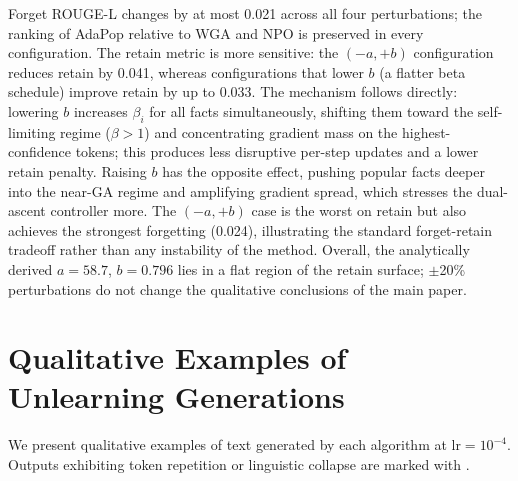Forget ROUGE-L changes by at most 0.021 across all four perturbations; the ranking of AdaPop relative to WGA and NPO is preserved in every configuration. The retain metric is more sensitive: the $(-a,+b)$ configuration reduces retain by 0.041, whereas configurations that lower $b$ (a flatter beta schedule) improve retain by up to 0.033. The mechanism follows directly: lowering $b$ increases $\beta_i$ for all facts simultaneously, shifting them toward the self-limiting regime ($\beta > 1$) and concentrating gradient mass on the highest-confidence tokens; this produces less disruptive per-step updates and a lower retain penalty. Raising $b$ has the opposite effect, pushing popular facts deeper into the near-GA regime and amplifying gradient spread, which stresses the dual-ascent controller more. The $(-a,+b)$ case is the worst on retain but also achieves the strongest forgetting (0.024), illustrating the standard forget-retain tradeoff rather than any instability of the method. Overall, the analytically derived $a{=}58.7$, $b{=}0.796$ lies in a flat region of the retain surface; $\pm$20\% perturbations do not change the qualitative conclusions of the main paper.

\section{Qualitative Examples of Unlearning Generations}
\label{app:generation_examples}

We present qualitative examples of text generated by each algorithm at $\text{lr}=10^{-4}$. Outputs exhibiting token repetition or linguistic collapse are marked with \loopmark.

\vspace{1em}

